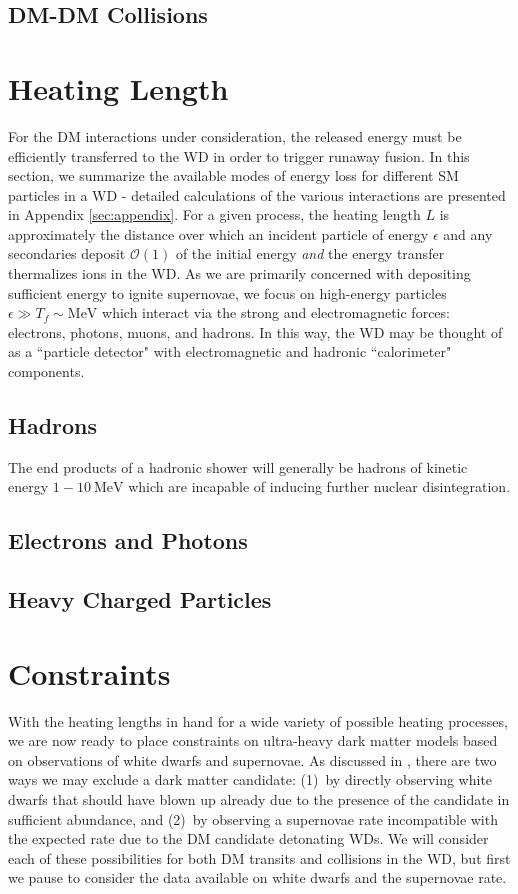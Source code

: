 \documentclass[twocolumn,showpacs,preprintnumbers,amsmath,amssymb,prd]{revtex4}
\newcommand{\OO}{\mathcal{O}}
\begin{document}
\subsection{DM-DM Collisions}

\section{Heating Length}
\label{sec:heatinglength}
For the DM interactions under consideration, the released energy must be efficiently transferred to the WD in order to trigger runaway fusion. In this section, we summarize the available modes of energy loss for different SM particles in a WD - detailed calculations of the various interactions are presented in Appendix \ref{sec:appendix}. For a given process, the heating length $L$ is approximately the distance over which an incident particle of energy $\epsilon$ and any secondaries deposit $\OO(1)$ of the initial energy \emph{and} the energy transfer thermalizes ions in the WD. As we are primarily concerned with depositing sufficient energy to ignite supernovae, we focus on high-energy particles $\epsilon \gg T_f \sim \text{MeV}$ which interact via the strong and electromagnetic forces: electrons, photons, muons, and hadrons. In this way, the WD may be thought of as a ``particle detector" with electromagnetic and hadronic ``calorimeter" components.

\subsection{Hadrons}

The end products of a hadronic shower will generally be hadrons of kinetic energy $1-10 ~\text{MeV}$ which are incapable of inducing further nuclear disintegration.

\subsection{Electrons and Photons}

\subsection{Heavy Charged Particles}


\section{Constraints}
\label{sec:Constraints}

With the heating lengths in hand for a wide variety of possible heating processes, we are now ready to place constraints on ultra-heavy dark matter models based on observations of white dwarfs and supernovae. As discussed in \cite{Graham:2015apa}, there are two ways we may exclude a dark matter candidate: (1)~by directly observing white dwarfs that should have blown up already due to the presence of the candidate in sufficient abundance, and (2)~by observing a supernovae rate incompatible with the expected rate due to the DM candidate detonating WDs. We will consider each of these possibilities for both DM transits and collisions in the WD, but first we pause to consider the data available on white dwarfs and the supernovae rate.
\end{document}
